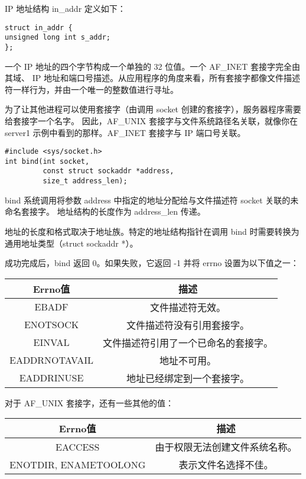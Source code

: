 \documentclass{ctexart}
\begin{document}
IP 地址结构 in\_addr 定义如下：  
\begin{verbatim}  
struct in_addr {  
unsigned long int s_addr;  
};  
\end{verbatim}  
一个 IP 地址的四个字节构成一个单独的 32 位值。一个 AF\_INET 套接字完全由其域、
IP 地址和端口号描述。从应用程序的角度来看，所有套接字都像文件描述符一样行为，并由一个唯一的整数值进行寻址。  

为了让其他进程可以使用套接字（由调用 socket 创建的套接字），服务器程序需要给套接字一个名字。
因此，AF\_UNIX 套接字与文件系统路径名关联，就像你在 server1 示例中看到的那样。AF\_INET 套接字与 IP 端口号关联。  

\begin{verbatim}  
#include <sys/socket.h>  
int bind(int socket, 
         const struct sockaddr *address, 
         size_t address_len);  
\end{verbatim}  

bind 系统调用将参数 address 中指定的地址分配给与文件描述符 socket 关联的未命名套接字。
地址结构的长度作为 address\_len 传递。  
  
地址的长度和格式取决于地址族。特定的地址结构指针在调用 bind 时需要转换为通用地址类型（struct sockaddr *）。  
  
成功完成后，bind 返回 0。如果失败，它返回 -1 并将 errno 设置为以下值之一：  
\begin{center}  
\begin{tabular}{|c|c|}  
\hline  
Errno值 & 描述 \\  
\hline  
EBADF & 文件描述符无效。 \\  
\hline  
ENOTSOCK & 文件描述符没有引用套接字。 \\  
\hline  
EINVAL & 文件描述符引用了一个已命名的套接字。 \\  
\hline  
EADDRNOTAVAIL & 地址不可用。 \\  
\hline  
EADDRINUSE & 地址已经绑定到一个套接字。 \\  
\hline  
\end{tabular}  
\end{center}  
  
对于 AF\_UNIX 套接字，还有一些其他的值：  
\begin{center}  
\begin{tabular}{|c|c|}  
\hline  
Errno值 & 描述 \\  
\hline  
EACCESS & 由于权限无法创建文件系统名称。 \\  
\hline  
ENOTDIR, ENAMETOOLONG & 表示文件名选择不佳。 \\  
\hline  
\end{tabular}  
\end{center}  
\end{document}
